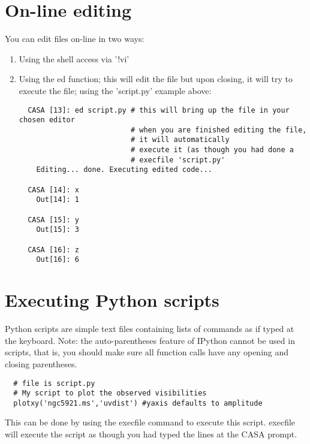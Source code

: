 \section{On-line editing}
\label{section:python.edit}

You can edit files on-line in two ways:

\begin{enumerate}
   \item Using the shell access via '!vi'
   \item Using the ed function; this will edit the file but upon
   closing, it will try to execute the file; using the 'script.py'
   example above: 

\small
\begin{verbatim}
  CASA [13]: ed script.py # this will bring up the file in your chosen editor
                          # when you are finished editing the file, 
                          # it will automatically
                          # execute it (as though you had done a 
                          # execfile 'script.py'
    Editing... done. Executing edited code...

  CASA [14]: x
    Out[14]: 1

  CASA [15]: y
    Out[15]: 3

  CASA [16]: z
    Out[16]: 6
\end{verbatim}
\normalsize
\end{enumerate}

\section{Executing Python scripts}
\label{section:python.scripts}

Python scripts are simple text files containing lists of commands as
if typed at the keyboard. Note: the auto-parentheses feature of IPython
cannot be used in scripts, that is, you should make sure all function
calls have any opening and closing parentheses. 

\small
\begin{verbatim}
  # file is script.py
  # My script to plot the observed visibilities
  plotxy('ngc5921.ms','uvdist') #yaxis defaults to amplitude
\end{verbatim}
\normalsize

This can be done by using the execfile command to execute this
script.  execfile will execute the script as though you had typed the
lines at the CASA prompt.  

